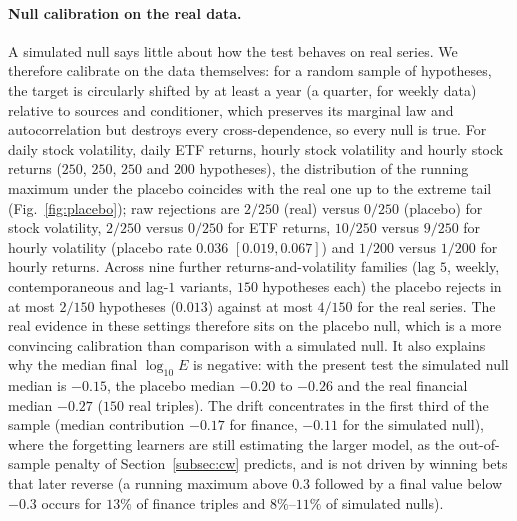 \documentclass[pdflatex,sn-mathphys-ay]{sn-jnl}%
\theoremstyle{thmstyleone}%
\theoremstyle{thmstyletwo}%
\theoremstyle{thmstylethree}%
\begin{document}
\paragraph{Null calibration on the real data.} A simulated null says little about how the test behaves on real series. We therefore calibrate on the data themselves: for a random sample of hypotheses, the target is circularly shifted by at least a year (a quarter, for weekly data) relative to
sources and conditioner, which preserves its marginal law and autocorrelation but destroys every cross-dependence, so every null is true. For daily stock volatility, daily ETF returns, hourly stock volatility and hourly stock returns ($250$, $250$, $250$ and $200$ hypotheses), the distribution of the running maximum
under the placebo coincides with the real one up to the extreme tail (Fig.~\ref{fig:placebo}); raw rejections are $2/250$ (real) versus $0/250$ (placebo) for stock volatility, $2/250$ versus $0/250$ for ETF returns, $10/250$ versus $9/250$ for hourly volatility
(placebo rate $0.036$ $[0.019,0.067]$) and $1/200$ versus $1/200$ for hourly returns. Across nine further returns-and-volatility families (lag $5$, weekly, contemporaneous and lag-$1$ variants, $150$ hypotheses each) the placebo rejects in at most $2/150$ hypotheses ($0.013$) against at most $4/150$ for the real series. The real evidence in these settings therefore sits on the placebo null, which is a more convincing calibration than comparison with a simulated null. It also explains why the median final $\log_{10}E$ is negative: with the present test the simulated null median is $-0.15$,
the placebo median $-0.20$ to $-0.26$ and the real financial median $-0.27$ ($150$ real triples). The drift concentrates in the first third of the sample (median contribution $-0.17$ for finance, $-0.11$ for the simulated null), where the forgetting learners are still estimating
the larger model, as the out-of-sample penalty of Section~\ref{subsec:cw} predicts, and is not driven by winning bets that later reverse (a running maximum above $0.3$ followed by a final value below $-0.3$ occurs for $13\%$ of finance triples and $8\%$--$11\%$ of simulated nulls).
\end{document}

